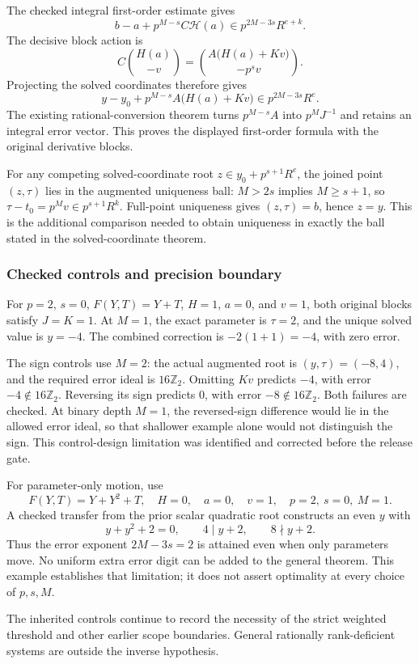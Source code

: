 The checked integral first-order estimate gives \[
b-a+p^{M-s}C\mathcal H(a)\in p^{2M-3s}R^{e+k}.
\] The decisive block action is \[
C\binom{H(a)}{-v}
=
\binom{A\bigl(H(a)+Kv\bigr)}{-p^sv}.
\] Projecting the solved coordinates therefore gives \[
y-y_0+p^{M-s}A\bigl(H(a)+Kv\bigr)
\in p^{2M-3s}R^e.
\] The existing rational-conversion theorem turns \(p^{M-s}A\) into
\(p^MJ^{-1}\) and retains an integral error vector. This proves the
displayed first-order formula with the original derivative blocks.

For any competing solved-coordinate root \(z\in y_0+p^{s+1}R^e\), the
joined point \((z,\tau)\) lies in the augmented uniqueness ball:
\(M>2s\) implies \(M\ge s+1\), so \(\tau-t_0=p^Mv\in p^{s+1}R^k\).
Full-point uniqueness gives \((z,\tau)=b\), hence \(z=y\). This is the
additional comparison needed to obtain uniqueness in exactly the ball
stated in the solved-coordinate theorem.

\hypertarget{cont10:checked-controls-and-precision-boundary}{%
\subsubsection{Checked controls and precision
boundary}\label{cont10:checked-controls-and-precision-boundary}}

For \(p=2\), \(s=0\), \(F(Y,T)=Y+T\), \(H=1\), \(a=0\), and \(v=1\),
both original blocks satisfy \(J=K=1\). At \(M=1\), the exact parameter
is \(\tau=2\), and the unique solved value is \(y=-4\). The combined
correction is \(-2(1+1)=-4\), with zero error.

The sign controls use \(M=2\): the actual augmented root is
\((y,\tau)=(-8,4)\), and the required error ideal is \(16\mathbb Z_2\).
Omitting \(Kv\) predicts \(-4\), with error \(-4\notin16\mathbb Z_2\).
Reversing its sign predicts \(0\), with error \(-8\notin16\mathbb Z_2\).
Both failures are checked. At binary depth \(M=1\), the reversed-sign
difference would lie in the allowed error ideal, so that shallower
example alone would not distinguish the sign. This control-design
limitation was identified and corrected before the release gate.

For parameter-only motion, use \[
F(Y,T)=Y+Y^2+T,\quad H=0,\quad a=0,\quad v=1,\quad p=2,\ s=0,\ M=1.
\] A checked transfer from the prior scalar quadratic root constructs an
even \(y\) with \[
y+y^2+2=0,\qquad 4\mid y+2,\qquad 8\nmid y+2.
\] Thus the error exponent \(2M-3s=2\) is attained even when only
parameters move. No uniform extra error digit can be added to the
general theorem. This example establishes that limitation; it does not
assert optimality at every choice of \(p,s,M\).

The inherited controls continue to record the necessity of the strict
weighted threshold and other earlier scope boundaries. General
rationally rank-deficient systems are outside the inverse hypothesis.
